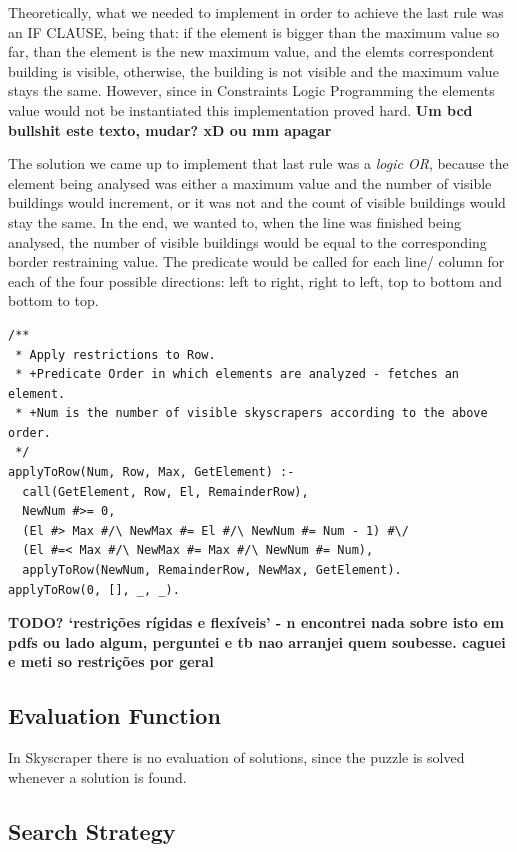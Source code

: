 \documentclass{llncs}
\begin{document}
Theoretically, what we needed to implement in order to achieve the last rule was an IF CLAUSE, being that: if the element is bigger than the maximum value so far, than the element is the new maximum value, and the elemts correspondent building is visible, otherwise, the building is not visible and the maximum value stays the same. However, since in Constraints  Logic Programming the elements value would not be instantiated this implementation proved hard. \textbf{Um bcd bullshit este texto, mudar? xD ou mm apagar}

The solution we came up to implement that last rule was a \textit{logic OR}, because the element being analysed was either a maximum value and the number of visible buildings would increment, or it was not and the count of visible buildings would stay the same. In the end, we wanted to, when the line was finished being analysed, the number of visible buildings would be equal to the corresponding border restraining value. The predicate would be called for each line/ column for each of the four possible directions: left to right, right to left, top to bottom and bottom to top. 

\begin{lstlisting}[frame=tblr, caption=Constraint that assures correct number of visible buildings ]
/**
 * Apply restrictions to Row.
 * +Predicate Order in which elements are analyzed - fetches an element.
 * +Num is the number of visible skyscrapers according to the above order.
 */
applyToRow(Num, Row, Max, GetElement) :-
  call(GetElement, Row, El, RemainderRow),
  NewNum #>= 0,
  (El #> Max #/\ NewMax #= El #/\ NewNum #= Num - 1) #\/
  (El #=< Max #/\ NewMax #= Max #/\ NewNum #= Num),
  applyToRow(NewNum, RemainderRow, NewMax, GetElement).
applyToRow(0, [], _, _).
\end{lstlisting}

\textbf{TODO?  `restrições rígidas e flexíveis' - n encontrei nada sobre isto em pdfs ou lado algum, perguntei e tb nao arranjei quem soubesse. caguei e meti so restrições por geral}

%
\subsection{Evaluation Function}

In Skyscraper there is no evaluation of solutions, since the puzzle is solved whenever a solution is found.

%
\subsection{Search Strategy}
\end{document}
